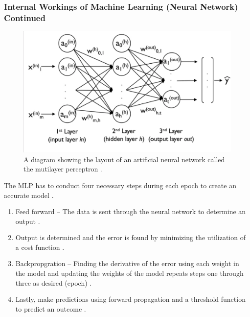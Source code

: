 \documentclass{beamer}
\begin{document}
\begin{frame}
\frametitle{Internal Workings of Machine Learning (Neural Network) Continued}
\scriptsize 
\begin{figure}[h]
\centering
\includegraphics[scale=0.25]{NN}
\caption{ \scriptsize A diagram showing the layout of an artificial neural network called the mutilayer perceptron \cite{pythonML}.}
\end{figure}

The MLP has to conduct four necessary steps during each epoch to create an accurate model \cite{pythonML}. 
\begin{enumerate}
    \item Feed forward --  The data is sent through the neural network to determine an output \cite{pythonML}.
    \item Output is determined and the error is found by minimizing the utilization of a cost function \cite{pythonML}.
    \item Backpropgration -- Finding the derivative of the error using each weight in the model and updating the weights of the model repeats steps one through three as desired (epoch) \cite{pythonML}.
    \item Lastly, make predictions using forward propagation and a threshold function to predict an outcome \cite{pythonML}.
\newline
\end{enumerate}
\end{frame}
\end{document}
